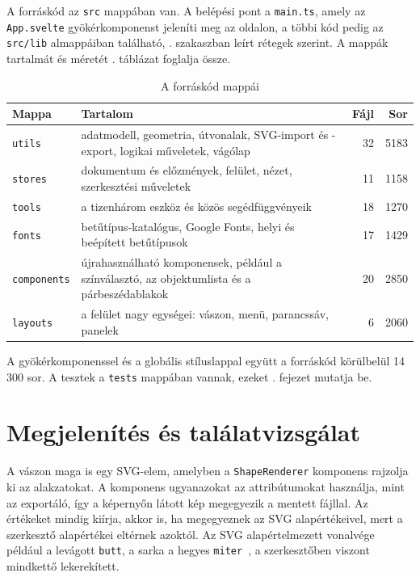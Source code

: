A forráskód az \texttt{src} mappában van. A belépési pont a \texttt{main.ts}, amely az \texttt{App.svelte} gyökérkomponenst jeleníti meg az oldalon, a többi kód pedig az \texttt{src/lib} almappáiban található, . szakaszban leírt rétegek szerint. A mappák tartalmát és méretét . táblázat foglalja össze.

\begin{table}[!htbp]
\caption{A forráskód mappái}
\label{tab:source-size}
\centering
\footnotesize
\begin{tabular}{|l|>{\raggedright\arraybackslash}p{}|r|r|}
\hline
\textbf{Mappa} & \textbf{Tartalom} & \textbf{Fájl} & \textbf{Sor} \\ \hline
\texttt{utils} & adatmodell, geometria, útvonalak, SVG-import és -export, logikai műveletek, vágólap & 32 & 5183 \\ \hline
\texttt{stores} & dokumentum és előzmények, felület, nézet, szerkesztési műveletek & 11 & 1158 \\ \hline
\texttt{tools} & a tizenhárom eszköz és közös segédfüggvényeik & 18 & 1270 \\ \hline
\texttt{fonts} & betűtípus-katalógus, Google Fonts, helyi és beépített betűtípusok & 17 & 1429 \\ \hline
\texttt{components} & újrahasználható komponensek, például a színválasztó, az objektumlista és a párbeszédablakok & 20 & 2850 \\ \hline
\texttt{layouts} & a felület nagy egységei: vászon, menü, parancssáv, panelek & 6 & 2060 \\ \hline
\end{tabular}
\end{table}

A gyökérkomponenssel és a globális stíluslappal együtt a forráskód körülbelül 14\,300 sor. A tesztek a \texttt{tests} mappában vannak, ezeket . fejezet mutatja be.

\section{Megjelenítés és találatvizsgálat}
\label{sec:rendering}

A vászon maga is egy SVG-elem, amelyben a \texttt{ShapeRenderer} komponens rajzolja ki az alakzatokat. A komponens ugyanazokat az attribútumokat használja, mint az exportáló, így a képernyőn látott kép megegyezik a mentett fájllal. Az értékeket mindig kiírja, akkor is, ha megegyeznek az SVG alapértékeivel, mert a szerkesztő alapértékei eltérnek azoktól. Az SVG alapértelmezett vonalvége például a levágott \texttt{butt}, a sarka a hegyes \texttt{miter}~\cite{w3c-svg-painting}, a szerkesztőben viszont mindkettő lekerekített.

